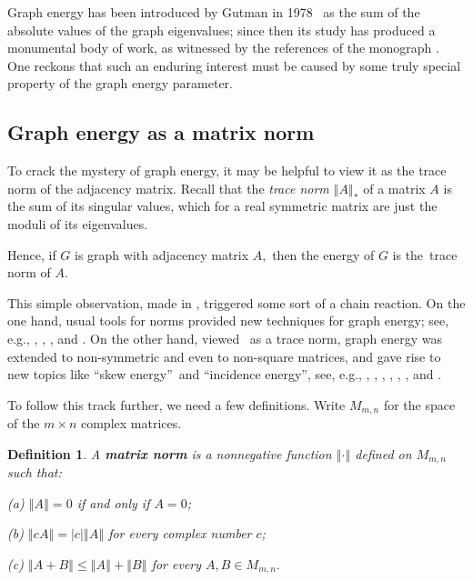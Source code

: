 \documentclass[12pt]{article}%
\newtheorem{definition}[theorem]{Definition}
\begin{document}
Graph energy has been introduced by Gutman in 1978 \cite{Gut78} \ as the sum
of the absolute values of the graph eigenvalues; since then its study has
produced a monumental body of work, as witnessed by the references of the
monograph \cite{GLS12}. One reckons that such an enduring interest must be
caused by some truly special property of the graph energy parameter.

\subsection{Graph energy as a matrix norm}

To crack the mystery of graph energy, it may be helpful to view it as the
trace norm of the adjacency matrix. Recall that the \emph{trace norm}
$\left\Vert A\right\Vert _{\ast}$ of a matrix $A$ is the sum of its singular
values, which for a real symmetric matrix are just the moduli of its eigenvalues.

Hence, if $G$ is graph with adjacency matrix $A,$ then the energy of $G$ is
the\ trace norm of $A.$

This simple observation, made in \cite{Nik07i}, triggered some sort of a chain
reaction. On the one hand, usual tools for norms provided new techniques for
graph energy; see, e.g., \cite{AGO09}, \cite{DaSo07}, \cite{DaSo08}, and
\cite{SRAG10}. On the other hand, viewed \ as a trace norm, graph energy was
extended to non-symmetric and even to non-square matrices, and gave rise to
new topics like \textquotedblleft skew energy\textquotedblright\ and
\textquotedblleft incidence energy\textquotedblright, see, e.g., \cite{ABW10},
\cite{GKM09}, \cite{GKMZ09}, \cite{JKM09}, \cite{ZhLi12}, \cite{ZKL15}, and
\cite{Zho10}.\medskip

To follow this track further, we need a few definitions. Write $M_{m,n}$ for
the space of the $m\times n$ complex matrices.

\begin{definition}
A \textbf{matrix norm} is a nonnegative function $\left\Vert \cdot\right\Vert
$ defined on $M_{m,n}$ such that:

(a) $\left\Vert A\right\Vert =0$ if and only if $A=0$;

(b) $\left\Vert cA\right\Vert =\left\vert c\right\vert \left\Vert A\right\Vert
$ for every complex number $c$;

(c) $\left\Vert A+B\right\Vert \leq\left\Vert A\right\Vert +\left\Vert
B\right\Vert $ for every $A,B\in M_{m,n}.$
\end{definition}
\end{document}
